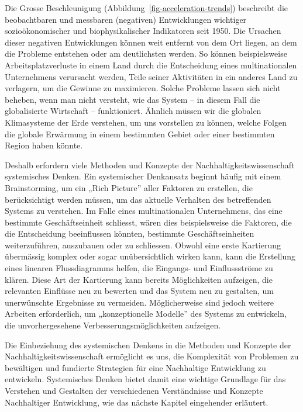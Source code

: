 \documentclass[
  nswissgerman,
  a4paper,
  openany]{book}
\begin{document}
Die Grosse Beschleunigung (Abbildung~\ref{fig-acceleration-trends})
beschreibt die beobachtbaren und messbaren (negativen) Entwicklungen
wichtiger sozioökonomischer und biophysikalischer Indikatoren seit 1950.
Die Ursachen dieser negativen Entwicklungen können weit entfernt von dem
Ort liegen, an dem die Probleme entstehen oder am deutlichsten werden.
So können beispielsweise Arbeitsplatzverluste in einem Land durch die
Entscheidung eines multinationalen Unternehmens verursacht werden, Teile
seiner Aktivitäten in ein anderes Land zu verlagern, um die Gewinne zu
maximieren. Solche Probleme lassen sich nicht beheben, wenn man nicht
versteht, wie das System -- in diesem Fall die globalisierte Wirtschaft
-- funktioniert. Ähnlich müssen wir die globalen Klimasysteme der Erde
verstehen, um uns vorstellen zu können, welche Folgen die globale
Erwärmung in einem bestimmten Gebiet oder einer bestimmten Region haben
könnte.

Deshalb erfordern viele Methoden und Konzepte der
Nachhaltigkeitswissenschaft systemisches Denken. Ein systemischer
Denkansatz beginnt häufig mit einem Brainstorming, um ein „Rich
Picture'' aller Faktoren zu erstellen, die berücksichtigt werden müssen,
um das aktuelle Verhalten des betreffenden Systems zu verstehen. Im
Falle eines multinationalen Unternehmens, das eine bestimmte
Geschäftseinheit schliesst, wären dies beispielsweise die Faktoren, die
die Entscheidung beeinflussen könnten, bestimmte Geschäftseinheiten
weiterzuführen, auszubauen oder zu schliessen. Obwohl eine erste
Kartierung übermässig komplex oder sogar unübersichtlich wirken kann,
kann die Erstellung eines linearen Flussdiagramms helfen, die Eingangs-
und Einflussströme zu klären. Diese Art der Kartierung kann bereits
Möglichkeiten aufzeigen, die relevanten Einflüsse neu zu bewerten und
das System neu zu gestalten, um unerwünschte Ergebnisse zu vermeiden.
Möglicherweise sind jedoch weitere Arbeiten erforderlich, um
„konzeptionelle Modelle'' des Systems zu entwickeln, die
unvorhergesehene Verbesserungsmöglichkeiten aufzeigen.

Die Einbeziehung des systemischen Denkens in die Methoden und Konzepte
der Nachhaltigkeitswissenschaft ermöglicht es uns, die Komplexität von
Problemen zu bewältigen und fundierte Strategien für eine Nachhaltige
Entwicklung zu entwickeln. Systemisches Denken bietet damit eine
wichtige Grundlage für das Verstehen und Gestalten der verschiedenen
Verständnisse und Konzepte Nachhaltiger Entwicklung, wie das nächste
Kapitel eingehender erläutert.
\end{document}
